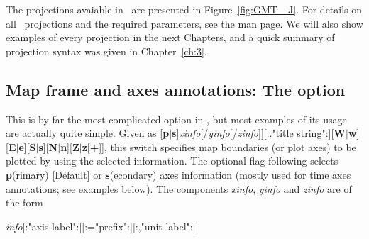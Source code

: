 The projections avaiable in \GMT\ are presented in Figure~\ref{fig:GMT_-J}.
For details on all \GMT\ projections and the required parameters, see the  man page.
We will also show examples of every projection in the next Chapters, and a quick
summary of projection syntax was given in Chapter~\ref{ch:3}.

\subsection{Map frame and axes annotations: The  option}
\label{sec:timeaxis}
This is by far the most complicated option in \GMT, but most examples
of its usage are actually quite simple.
Given as [\textbf{p}$|$\textbf{s}]\emph{xinfo}[/\emph{yinfo}[/\emph{zinfo}]][:."title
string":][\textbf{W}$|$\textbf{w}][\textbf{E}$|$\textbf{e}][\textbf{S}$|$\textbf{s}][\textbf{N}$|$\textbf{n}][\textbf{Z}$|$\textbf{z}[\textbf{+}]],
this switch specifies map boundaries (or plot axes) to be plotted by using the
selected information. The optional flag following  selects \textbf{p}(rimary) [Default] or \textbf{s}(econdary)
axes information (mostly used for time axes annotations; see examples below).
The components \emph{xinfo}, \emph{yinfo} and \emph{zinfo} are of the form \\

\par \emph{info}[:"axis label":][:="prefix":][:,"unit label":] \\

